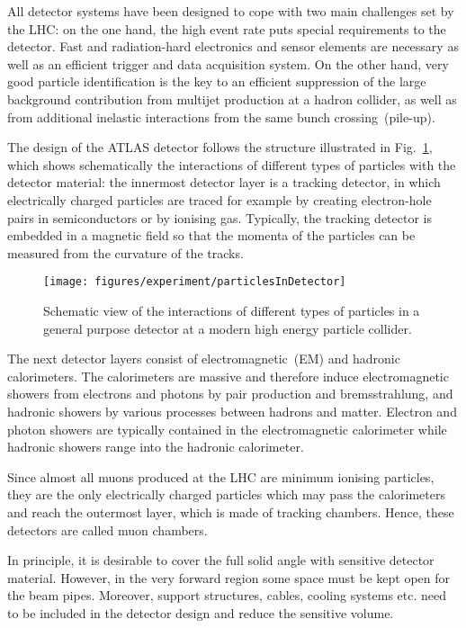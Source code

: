 All detector systems have been designed to cope with two main challenges set by the LHC:
on the one hand, the high event rate puts special requirements to the detector.
Fast and radiation-hard electronics and sensor elements are necessary as well as an efficient trigger and data acquisition system.
On the other hand, very good particle identification is the key to an efficient suppression of the large background contribution from multijet
production at a hadron collider, as well as from additional inelastic interactions from the same bunch crossing~(pile-up).

The design of the ATLAS detector follows the structure illustrated in Fig.~\ref{fig:particlesInDet}, which shows schematically
the interactions of different types of particles with the detector material:
the innermost detector layer is a tracking detector, in which electrically charged particles are traced for example by creating electron-hole pairs
in semiconductors or by ionising gas.
Typically, the tracking detector is embedded in a magnetic field so that the momenta of the particles can be measured from the curvature
of the tracks.

\begin{figure}[h]
\begin{center}
\texttt{[image: figures/experiment/particlesInDetector]}
\caption[Schematic view of the interactions of particles in a general purpose detector]{
  Schematic view of the interactions of different types of particles in a general purpose detector at a modern high energy particle collider.}
\label{fig:particlesInDet}
\end{center}
\end{figure}

The next detector layers consist of electromagnetic~(EM) and hadronic calorimeters.
The calorimeters are massive and therefore induce electromagnetic showers
from electrons and photons by pair production and bremsstrahlung, and hadronic showers by various processes between hadrons and matter.
Electron and photon showers are typically contained
in the electromagnetic calorimeter while hadronic showers range into the hadronic calorimeter.

Since almost all muons produced at the LHC are minimum ionising particles, they are the only electrically charged particles which may pass the
calorimeters and reach the outermost layer, which is made of tracking chambers.
Hence, these detectors are called muon chambers.

In principle, it is desirable to cover the full solid angle with sensitive detector material.
However, in the very forward region some space must be kept open for the beam pipes.
Moreover, support structures, cables, cooling systems etc. need to be included in the detector design and reduce the sensitive volume.

